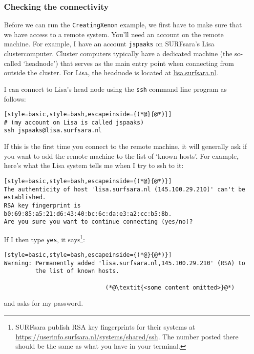 \subsubsection{Checking the connectivity}

Before we can run the \texttt{CreatingXenon} example, we first have to make sure that we have access to a remote system. You'll need an account on the remote machine. For example, I have an account \texttt{jspaaks} on SURFsara's Lisa clustercomputer. Cluster computers typically have a dedicated machine (the so-called `headnode') that serves as the main entry point when connecting from outside the cluster. For Lisa, the headnode is located at \url{lisa.surfsara.nl}.

I can connect to Lisa's head node using the \texttt{ssh} command line program as follows:
\begin{lstlisting}[style=basic,style=bash,escapeinside={(*@}{@*)}]
# (my account on Lisa is called jspaaks)
ssh jspaaks@lisa.surfsara.nl
\end{lstlisting}

If this is the first time you connect to the remote machine, it will generally ask if you want to add the remote machine to the list of `known hosts'. For example, here's what the Lisa system tells me when I try to ssh to it:
\begin{lstlisting}[style=basic,style=bash,escapeinside={(*@}{@*)}]
The authenticity of host 'lisa.surfsara.nl (145.100.29.210)' can't be
established.
RSA key fingerprint is b0:69:85:a5:21:d6:43:40:bc:6c:da:e3:a2:cc:b5:8b.
Are you sure you want to continue connecting (yes/no)?
\end{lstlisting}
If I then type \texttt{yes}, it says\footnote{SURFsara publish RSA key fingerprints for their systems at \url{https://userinfo.surfsara.nl/systems/shared/ssh}. The number posted there should be the same as what you have in your terminal.}:
\begin{lstlisting}[style=basic,style=bash,escapeinside={(*@}{@*)}]
Warning: Permanently added 'lisa.surfsara.nl,145.100.29.210' (RSA) to
         the list of known hosts.

                             (*@\textit{<some content omitted>}@*)
\end{lstlisting}
and asks for my password.

